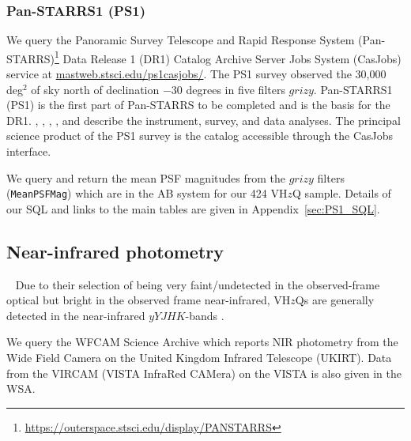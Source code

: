 \documentclass[usenatbib]{mnras}
\begin{document}
    \subsubsection{Pan-STARRS1 (PS1)} 
    We query the Panoramic Survey Telescope and Rapid Response System
    (Pan-STARRS)\footnote{\href{https://outerspace.stsci.edu/display/PANSTARRS}{https://outerspace.stsci.edu/display/PANSTARRS}}
    Data Release 1 (DR1) Catalog Archive Server Jobs System (CasJobs)
    service at
    \href{http://mastweb.stsci.edu/ps1casjobs/}{mastweb.stsci.edu/ps1casjobs/}.
    The PS1 survey observed the 30,000 deg$^{2}$ of sky north of
    declination $-30$ degrees in five filters $grizy$.  Pan-STARRS1 (PS1)
    is the first part of Pan-STARRS to be completed and is the basis for
    the DR1.  \citet{Chambers2016}, \citet{Magnier2016a},
    \citet{Waters2016}, \citet{Magnier2016b}, \citet{Magnier2016c} and
    \citet{Flewelling2016} describe the instrument, survey, and data
    analyses.  The principal science product of the PS1 survey is the
    catalog accessible through the CasJobs interface.
    
    We query and return the mean PSF magnitudes from the $grizy$ filters
    ({\tt MeanPSFMag}) which are in the AB system for our 424 VH$z$Q
    sample. Details of our SQL and links to the main tables are given
    in Appendix~\ref{sec:PS1_SQL}.
    
    \iffalse
    \subsubsection{DECam} 
    The Dark Energy Camera \citep[DECam][]{Flaugher2015} is 
    is a wide-field imager with a 2.2 degree diameter field of view 
    mounted at the prime focus of the Victor M. Blanco 4 m telescope 
    at the Cerro Tololo International Observatory. We use data 
    from both the Dark Energy Survey \citep[DES; ][]{DES2016} and 
    the DESI Legacy Imaging Survey \citep[DECaLS; ][]{Dey2018}. 
    \fi
    

\subsection{Near-infrared photometry}~\label{sec:NIR_data} 
Due to their selection of being very faint/undetected in the
observed-frame optical but bright in the observed frame near-infrared,
VH$z$Qs are generally detected in the near-infrared $yYJHK$-bands
\citep[$\approx$0.98-2.38$\mu$m; e.g., ][]{Peth2011}.

We query the WFCAM Science Archive
\citep[\href{http://wsa.roe.ac.uk/}{WSA}; ][]{Hambly2008} which
reports NIR photometry from the Wide Field Camera \citep[WFCAM;
][]{Casali2007} on the United Kingdom Infrared Telescope (UKIRT).
Data from the VIRCAM (VISTA InfraRed CAMera) on the VISTA
\citep[Visible and Infrared Survey Telescope for Astronomy;
][]{Emerson2006, Dalton2006} is also given in the WSA.
\end{document}
